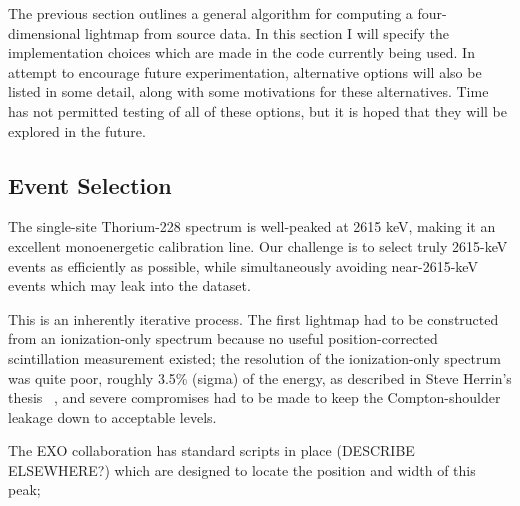 The previous section outlines a general algorithm for computing a four-dimensional lightmap from source data.  In this section I will specify the implementation choices which are made in the code currently being used.  In attempt to encourage future experimentation, alternative options will also be listed in some detail, along with some motivations for these alternatives.  Time has not permitted testing of all of these options, but it is hoped that they will be explored in the future.

\subsection{Event Selection}

The single-site Thorium-228 spectrum is well-peaked at 2615 keV, making it an excellent monoenergetic calibration line.  Our challenge is to select truly 2615-keV events as efficiently as possible, while simultaneously avoiding near-2615-keV events which may leak into the dataset.

This is an inherently iterative process.  The first lightmap had to be constructed from an ionization-only spectrum because no useful position-corrected scintillation measurement existed; the resolution of the ionization-only spectrum was quite poor, roughly 3.5\% (sigma) of the energy, as described in Steve Herrin's thesis ~\cite{ThesisSteve}, and severe compromises had to be made to keep the Compton-shoulder leakage down to acceptable levels.


The EXO collaboration has standard scripts in place (DESCRIBE ELSEWHERE?) which are designed to locate the position and width of this peak;







